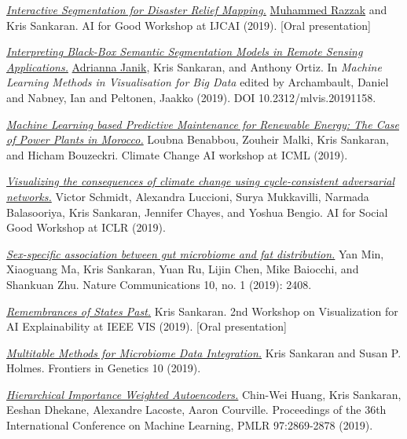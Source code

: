 \documentclass[letterpaper]{article}
\renewenvironment{itemize}{
  \begin{list}{}{
    \setlength{\leftmargin}{1.5em}
  }
}{
  \end{list}
}
\begin{document}
\begin{itemize}
  \item \href{http://krisrs1128.github.io/personal-site/projects/IJCAI_AI4G_Submission.pdf}{\textit{Interactive Segmentation for Disaster Relief Mapping.}} \underline{Muhammed Razzak} and Kris Sankaran. AI for Good Workshop at IJCAI (2019). [Oral presentation]  
  \item \href{https://diglib.eg.org/items/3faa9eb7-7278-4c37-ba98-aace4a32b583}{\textit{Interpreting Black-Box Semantic Segmentation Models in Remote Sensing Applications.}} \underline{Adrianna Janik}, Kris Sankaran, and Anthony Ortiz. In \textit{Machine Learning Methods in Visualisation for Big Data} edited by Archambault, Daniel and Nabney, Ian and Peltonen, Jaakko (2019). DOI 10.2312/mlvis.20191158.  
  \item \href{https://s3.us-east-1.amazonaws.com/climate-change-ai/papers/icml2019/35/paper.pdf}{\textit{Machine Learning based Predictive Maintenance for Renewable Energy: The Case of Power Plants in Morocco.}} Loubna Benabbou, Zouheir Malki, Kris Sankaran, and Hicham Bouzeckri. Climate Change AI workshop at ICML (2019).  
  \item \href{https://arxiv.org/abs/1905.03709}{\textit{Visualizing the consequences of climate change using cycle-consistent adversarial networks.}} Victor Schmidt, Alexandra Luccioni, Surya Mukkavilli, Narmada Balasooriya, Kris Sankaran, Jennifer Chayes, and Yoshua Bengio. AI for Social Good Workshop at ICLR (2019).  
  \item \href{https://doi.org/10.1145/3485128}{\textit{Sex-specific association between gut microbiome and fat distribution.}} Yan Min, Xiaoguang Ma, Kris Sankaran, Yuan Ru, Lijin Chen, Mike Baiocchi, and Shankuan Zhu. Nature Communications 10, no. 1 (2019): 2408.  
  \item \href{https://observablehq.com/@krisrs1128/remembrances-of-states-past}{\textit{Remembrances of States Past.}} Kris Sankaran. 2nd Workshop on Visualization for AI Explainability at IEEE VIS (2019). [Oral presentation]  
  \item \href{https://doi.org/10.3389/fgene.2019.00627}{\textit{Multitable Methods for Microbiome Data Integration.}} Kris Sankaran and Susan P. Holmes. Frontiers in Genetics 10 (2019).  
  \item \href{http://proceedings.mlr.press/v97/huang19d/huang19d.pdf}{\textit{Hierarchical Importance Weighted Autoencoders.}} Chin-Wei Huang, Kris Sankaran, Eeshan Dhekane, Alexandre Lacoste, Aaron Courville. Proceedings of the 36th International Conference on Machine Learning, PMLR 97:2869-2878 (2019).  

\end{itemize}
\end{document}
